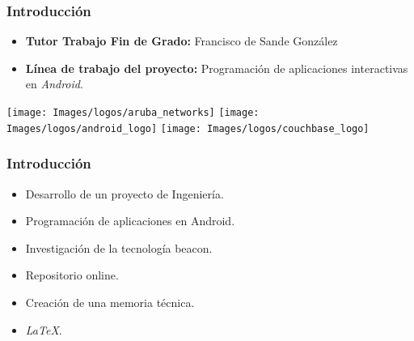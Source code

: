 \begin{frame}
    \frametitle{Introducción}
    \begin{itemize}
	\item \textbf{Tutor Trabajo Fin de Grado:} Francisco de Sande González
        \item \textbf{Línea de trabajo del proyecto:} Programación de aplicaciones interactivas en {\it Android}.
    \end{itemize}
        {\inserttitlegraphic\par}
		\vfill \texttt{[image: Images/logos/aruba\_networks]}
		\hfill %
		\texttt{[image: Images/logos/android\_logo]}
		\hfill \texttt{[image: Images/logos/couchbase\_logo]}
\end{frame}
\begin{frame}
	\frametitle{Introducción}
		\begin{itemize}
			\item Desarrollo de un proyecto de Ingeniería.
			\item Programación de aplicaciones en Android.
			\item Investigación de la tecnología beacon.
			\item Repositorio online.
			\item Creación de una memoria técnica.
			\item \textit{LaTeX}.
		\end{itemize}
	\endblock{}
\end{frame}
